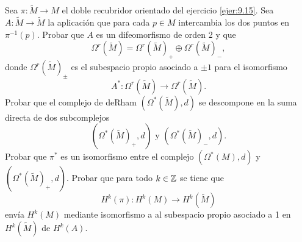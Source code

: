 \documentclass[twoside]{article}
\begin{document}
\begin{ejercicio}{9.18}
Sea $\pi:\widetilde{M}\to M$ el doble recubridor orientado del ejercicio \ref{ejer:9.15}. Sea $A:\widetilde{M}\to \widetilde{M}$ la aplicación que para cada $p\in M$ intercambia los dos puntos en $\pi^{-1}(p)$. Probar que $A$ es un difeomorfismo de orden 2 y que
\[
\Omega^r(\widetilde{M})=\Omega^r(\widetilde{M})_+\oplus\Omega^r(\widetilde{M})_-,
\]
donde $\Omega^r(\widetilde{M})_\pm$ es el subespacio propio asociado a $\pm 1$ para el isomorfismo
\[
A^*:\Omega^r(\widetilde{M})\to \Omega^r(\widetilde{M}).
\]
Probar que el complejo de deRham $(\Omega^*(\widetilde{M}),d)$ se descompone en la suma directa de dos subcomplejos
\[
(\Omega^*(\widetilde{M})_+,d)\text{ y } (\Omega^*(\widetilde{M})_-,d).
\]
Probar que $\pi^*$ es un isomorfismo entre el complejo $(\Omega^*(M),d)$ y $(\Omega^*(\widetilde{M})_+,d)$. Probar que para todo $k\in\mathbb{Z}$ se tiene que
\[
H^k(\pi):H^k(M)\to H^k(\widetilde{M})
\]
envía $H^k(M)$ mediante isomorfismo a al subespacio propio asociado a 1 en $H^k(\widetilde{M})$ de $H^k(A)$. 
\end{ejercicio}
\end{document}
